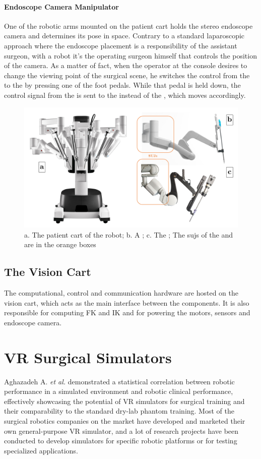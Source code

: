 \documentclass[../main.tex]{subfiles}
\begin{document}
\paragraph{Endoscope Camera Manipulator} One of the robotic arms mounted on the patient cart holds the stereo endoscope camera and determines its pose in space. Contrary to a standard laparoscopic approach where the endoscope placement is a responsibility of the assistant surgeon, with a \davinci robot it's the operating surgeon himself that controls the position of the camera. As a matter of fact, when the operator at the console desires to change the viewing point of the surgical scene, he switches the control from the \psms to the \ecm by pressing one of the foot pedals. While that pedal is held down, the control signal from the \mtms is sent to the \ecm instead of the \psms, which moves accordingly.

\begin{figure}[h]
    \centering
    \includegraphics[width=\textwidth]{images/patient_cart_panel.png}
    \caption{a. The patient cart of the \davinci robot; b. A \psm; c. The \ecm; The \acp{suj} of the \psm and \ecm are in the orange boxes}
    \label{fig:patientcartpanel}
\end{figure}

\subsection{The Vision Cart} 
The computational, control and communication hardware are hosted on the vision cart, which acts as the main interface between the components. It is also responsible for computing FK and IK and for powering the motors, sensors and endoscope camera.

\section{VR Surgical Simulators}
Aghazadeh A. \textit{et al.} \cite{Aghazadeh2016} demonstrated a statistical correlation between robotic performance in a simulated environment and robotic clinical performance, effectively showcasing the potential of VR simulators for surgical training and their comparability to the standard dry-lab phantom training. Most of the surgical robotics companies on the market have developed and marketed their own general-purpose VR simulator, and a lot of research projects have been conducted to develop simulators for specific robotic platforms or for testing specialized applications.
\end{document}
